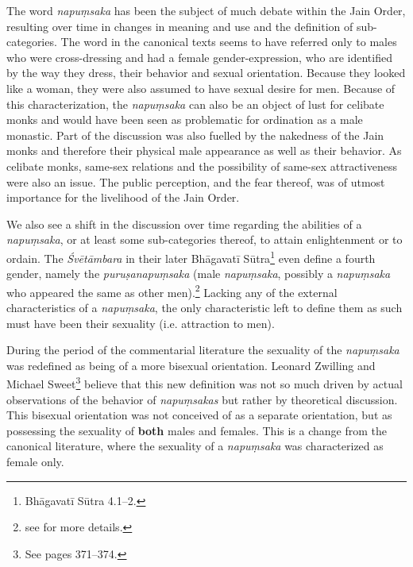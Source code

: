 The word {\em napuṃsaka} has been the subject of much debate within the Jain Order, resulting over time in changes in meaning and use and the definition of sub-categories. The word in the canonical texts seems to have referred only to males who were cross-dressing and had a female gender-expression, who are identified by the way they dress, their behavior and sexual orientation. Because they looked like a woman, they were also assumed to have sexual desire for men. Because of this characterization, the {\em napuṃsaka} can also be an object of lust for celibate monks and would have been seen as problematic for ordination as a male monastic. Part of the discussion was also fuelled by the nakedness of the Jain monks and therefore their physical male appearance as well as their behavior. As celibate monks, same-sex relations and the possibility of same-sex attractiveness were also an issue. The public perception, and the fear thereof, was of utmost importance for the livelihood of the Jain Order. 

We also see a shift in the discussion over time regarding the abilities of a {\em napuṃsaka}, or at least some sub-categories thereof, to attain enlightenment or to ordain. The {\em Śvētāmbara} in their later Bhāgavatī Sūtra\footnote{Bhāgavatī Sūtra 4.1–2.} even define a fourth gender, namely the {\em puruṣanapuṃsaka} (male {\em napuṃsaka}, possibly a {\em napuṃsaka} who appeared the same as other men).\footnote{see \cite{zwilling} for more details.} Lacking any of the external characteristics of a {\em napuṃsaka}, the only characteristic left to define them as such must have been their sexuality (i.e. attraction to men).

During the period of the commentarial literature the sexuality of the {\em napuṃsaka} was redefined as being of a more bisexual orientation. Leonard Zwilling and Michael Sweet\footnote{See \cite{zwilling} pages 371–374.} believe that this new definition was not so much driven by actual observations of the behavior of {\em napuṃsakas} but rather by theoretical discussion. This bisexual orientation was not conceived of as a separate orientation, but as possessing the sexuality of \textbf{both} males and females. This is a change from the canonical literature, where the sexuality of a {\em napuṃsaka} was characterized as female only.

